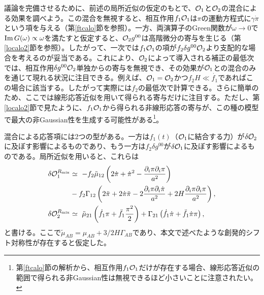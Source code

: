 議論を完備させるために、前述の局所近似の仮定のもとで、${\cal O}_1$と${\cal O}_2$の混合による効果を調べよう。この混合を無視すると、相互作用$f_1{\cal O}_1$は$\pi$の運動方程式に$\gamma\dot{\pi}$という項を与える（第\ref{ftcalo}節を参照）。一方、両演算子のGreen関数が$\omega\rightarrow 0$で${\rm Im}\,G(\omega)\propto\omega$を満たすと仮定すると、${\cal O}_2 g^{00}$は高階微分の寄与を生じる（第\ref{localo2}節を参照）。したがって、一次では$f_1{\cal O}_1$の項が$f_2\delta g^{00}{\cal O}_2$より支配的な場合を考えるのが妥当である。これにより、${\cal O}_2$によって導入される補正の最低次では、相互作用$\delta g^{00}{\cal O}_2$単独からの寄与を無視でき、その効果が${\cal O}_1$との混合のみを通じて現れる状況に注目できる。例えば、${\cal O}_1={\cal O}_2$かつ$f_2 H\ll\dot{f_1}$であればこの場合に該当する。したがって実際には$f_2$の最低次で計算できる。さらに簡単のため、ここでは線形応答近似を用いて得られる寄与だけに注目する。ただし、第\ref{localo2}節で見たように、$ f_1{\cal O}_1$から得られる非線形応答の寄与が、この種の模型で最大の非Gaussian性を生成する可能性がある\footnote{第\ref{ftcalo}節の解析から、相互作用$f_1{\cal O}_1$だけが存在する場合、線形応答近似の範囲で得られる非Gaussian性は無視できるほど小さいことに注意されたい。}。

混合による応答項には2つの型がある。一方は$f_1(t)$（${\cal O}_1$に結合する力）が$\delta{\cal O}_2$に及ぼす影響によるものであり、もう一方は$f_2\delta g^{00}$が$\delta{\cal O}_1$に及ぼす影響によるものである。局所近似を用いると、これらは
\begin{subequations}
\begin{align}
\delta{\cal O}_1^{R_{\rm mix}}&\simeq~ -f_2\tilde{\mu}_{12}\left( 2\dot{\pi}+\dot{\pi}^2-\frac{\partial_i\pi\partial_i\pi}{a^2}\right)\nonumber\\
&-f_2\Gamma_{12}\left(2\ddot{\pi}+2\dot{\pi}\ddot{\pi}-2\frac{\partial_i\pi\partial_i\dot{\pi}}{a^2}+2H\frac{\partial_i\pi\partial_i\pi}{a^2}\right),\\
\delta{\cal O}_2^{R_{\rm mix}}&\simeq~ \tilde\mu_{21}\left(\dot{f_1}\pi+\ddot{f_1}\frac{\pi^2}{2}\right)+\Gamma_{21}\left(\dot{f_1} \dot{\pi}+\ddot{f_1}\dot{\pi}\pi\right),
\end{align}
\end{subequations}
と書ける。ここで$\tilde{\mu}_{AB}={\mu}_{AB}+3/2H\Gamma_{AB}$であり、本文で述べたような創発的シフト対称性が存在すると仮定した。

